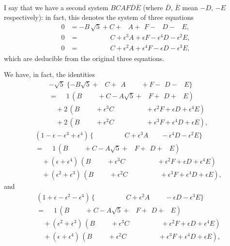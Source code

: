 \documentclass[11pt,a4paper]{book}
\begin{document}
I say that we have a second system $BCAF\bar{D}\bar{E}$ (where $\bar{D}$, $\bar{E}$ mean $-D$, $-E$
respectively): in fact, this denotes the system of three equations
\begin{align*}
0 &= -B\,\sqrt{5} + C + \phantom{\epsilon^3}A + \phantom{\epsilon}F - \phantom{\epsilon^4}D - \phantom{\epsilon^2}E,\\
0 &= \phantom{-B\sqrt{5} +}\; C + \epsilon^3 A + \epsilon F - \epsilon^4 D - \epsilon^2 E,\\
0 &= \phantom{-B\sqrt{5} +}\; C + \epsilon^2 A + \epsilon^4 F - \epsilon D - \epsilon^3 E,
\end{align*}
which are deducible from the original three equations.

We have, in fact, the identities
\begin{align*}
&- \sqrt{5}\; \{-B\sqrt{5} + \phantom{\epsilon^3}C + \phantom{\epsilon}A \phantom{+ \epsilon^4 F} + F - \phantom{\epsilon}D - \phantom{\epsilon^2}E\} \\
&= \phantom{+} 1\,(B \phantom{+ \epsilon^3 C} + C - A\sqrt{5} + \phantom{\epsilon^4}F + \phantom{\epsilon}D + \phantom{\epsilon^2}E) \\
&\quad + 2\,(B \phantom{+ \epsilon^3 C} + \epsilon^3 C \phantom{+ \epsilon F + \epsilon^4 D} + \epsilon^2 F + \epsilon D + \epsilon^4 E) \\
&\quad + 2\,(B \phantom{+ \epsilon^3 C} + \epsilon^2 C \phantom{+ \epsilon^4 F + \epsilon D} + \epsilon^3 F + \epsilon^4 D + \epsilon E),
\end{align*}
\begin{align*}
&(1 - \epsilon - \epsilon^3 + \epsilon^4)\, \{\phantom{-B\sqrt{5} +}\; C + \epsilon^3 A \phantom{+ \epsilon F} - \epsilon^4 D - \epsilon^2 E\} \\
&= \phantom{+} 1\,(B \phantom{+ \epsilon^3 C} + C - A\sqrt{5} + \phantom{\epsilon^4}F + \phantom{\epsilon}D + \phantom{\epsilon^2}E) \\
&\quad + (\epsilon + \epsilon^4)\,(B \phantom{+ \epsilon^3 C} + \epsilon^3 C \phantom{+ \epsilon F + \epsilon^4 D} + \epsilon^2 F + \epsilon D + \epsilon^4 E) \\
&\quad + (\epsilon^2 + \epsilon^3)\,(B \phantom{+ \epsilon^3 C} + \epsilon^2 C \phantom{+ \epsilon^4 F + \epsilon D} + \epsilon^3 F + \epsilon^4 D + \epsilon E),
\end{align*}
and
\begin{align*}
&(1 + \epsilon - \epsilon^2 - \epsilon^4)\, \{\phantom{-B\sqrt{5} +}\; C + \epsilon^2 A \phantom{+ \epsilon^4 F} - \epsilon D - \epsilon^3 E\} \\
&= \phantom{+} 1\,(B \phantom{+ \epsilon^3 C} + C - A\sqrt{5} + \phantom{\epsilon^4}F + \phantom{\epsilon}D + \phantom{\epsilon^2}E) \\
&\quad + (\epsilon^2 + \epsilon^3)\,(B \phantom{+ \epsilon^3 C} + \epsilon^3 C \phantom{+ \epsilon F + \epsilon^4 D} + \epsilon^2 F + \epsilon D + \epsilon^4 E) \\
&\quad + (\epsilon + \epsilon^4)\,(B \phantom{+ \epsilon^3 C} + \epsilon^2 C \phantom{+ \epsilon^4 F + \epsilon D} + \epsilon^3 F + \epsilon^4 D + \epsilon E),
\end{align*}
\end{document}
